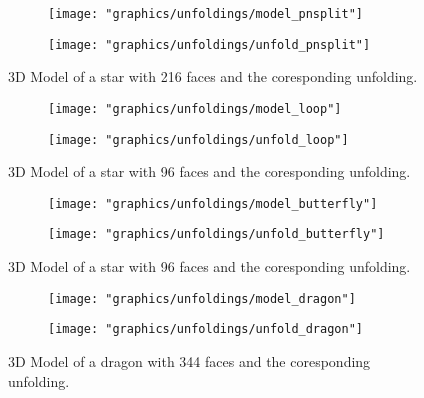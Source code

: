 \documentclass[draft,final]{vutinfth} %
\begin{document}
\begin{figure}
  \begin{subfigure}[b]{0.5\textwidth}
    \texttt{[image: "graphics/unfoldings/model\_pnsplit"]}
  \end{subfigure}
  \begin{subfigure}[b]{0.5\textwidth}
    \texttt{[image: "graphics/unfoldings/unfold\_pnsplit"]}
  \end{subfigure}
  
  \caption{3D Model of a star with 216 faces and the coresponding unfolding.}
  \label{fig:pnsplit}
\end{figure}

\begin{figure}
  \begin{subfigure}[b]{0.5\textwidth}
    \texttt{[image: "graphics/unfoldings/model\_loop"]}
  \end{subfigure}
  \begin{subfigure}[b]{0.5\textwidth}
    \texttt{[image: "graphics/unfoldings/unfold\_loop"]}
  \end{subfigure}
  
  \caption{3D Model of a star with 96 faces and the coresponding unfolding.}
  \label{fig:loop}
\end{figure}

\begin{figure}
  \begin{subfigure}[b]{0.5\textwidth}
    \texttt{[image: "graphics/unfoldings/model\_butterfly"]}
  \end{subfigure}
  \begin{subfigure}[b]{0.5\textwidth}
    \texttt{[image: "graphics/unfoldings/unfold\_butterfly"]}
  \end{subfigure}
  
  \caption{3D Model of a star with 96 faces and the coresponding unfolding.}
  \label{fig:butterfly}
\end{figure}

\begin{figure}
  \begin{subfigure}[b]{0.5\textwidth}
    \texttt{[image: "graphics/unfoldings/model\_dragon"]}
  \end{subfigure}
  \begin{subfigure}[b]{0.5\textwidth}
    \texttt{[image: "graphics/unfoldings/unfold\_dragon"]}
  \end{subfigure}
  
  \caption{3D Model of a dragon with 344 faces and the coresponding unfolding.}
  \label{fig:dragon}
\end{figure}
\end{document}
